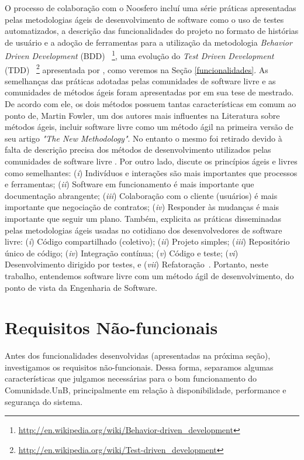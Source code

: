 O processo de colaboração com o Noosfero incluí uma série práticas apresentadas
pelas metodologias ágeis de desenvolvimento de software como o uso de testes
automatizados, a descrição das funcionalidades do projeto no formato de
histórias de usuário e a adoção de ferramentas para a utilização da metodologia
\textit{Behavior Driven Development} (BDD)%
~\footnote{\url{http://en.wikipedia.org/wiki/Behavior-driven_development}},
uma evolução do \textit{Test Driven Development} (TDD)%
~\footnote{\url{http://en.wikipedia.org/wiki/Test-driven_development}}
apresentada por , como veremos na Seção
\ref{funcionalidades}.
%
As semelhanças das práticas adotadas pelas comunidades de software livre e as
comunidades de métodos ágeis foram apresentadas por 
em sua tese de mestrado. De acordo com ele, os dois
métodos possuem tantas características em comum ao ponto de, Martin Fowler,
um dos autores mais influentes na Literatura sobre métodos ágeis,
incluir software livre como um método ágil na primeira versão de seu artigo
\textit{"The New Methodology"}. No entanto o mesmo foi retirado devido
à falta de descrição precisa dos métodos de desenvolvimento utilizados pelas
comunidades de software livre .
%
Por outro lado,  discute os princípios ágeis e livres
como semelhantes:
%
(\textit{i}) Indivíduos e interações são mais importantes que processos e
ferramentas;
(\textit{ii}) Software em funcionamento é mais importante que documentação
abrangente;
(\textit{iii}) Colaboração com o cliente (usuários) é mais importante que
negociação de contratos;
(\textit{iv}) Responder às mudanças é mais importante que seguir um plano.
%
Também, explicita as práticas disseminadas pelas metodologias ágeis usadas no
cotidiano dos desenvolvedores de software livre:
(\textit{i}) Código compartilhado (coletivo);
(\textit{ii}) Projeto simples;
(\textit{iii}) Repositório único de código;
(\textit{iv}) Integração contínua;
(\textit{v}) Código e teste;
(\textit{vi}) Desenvolvimento dirigido por testes, e
(\textit{vii}) Refatoração~\cite{corbucci2011}. Portanto, neste trabalho,
entendemos software livre com um método ágil de desenvolvimento, do ponto de
vista da Engenharia de Software.

\section{Requisitos Não-funcionais}

Antes dos funcionalidades desenvolvidas (apresentadas na próxima seção),
investigamos os requisitos não-funcionais. Dessa forma, separamos algumas
características que julgamos necessárias para o bom funcionamento do
Comunidade.UnB, principalmente em relação à disponibilidade, performance e
segurança do sistema.

